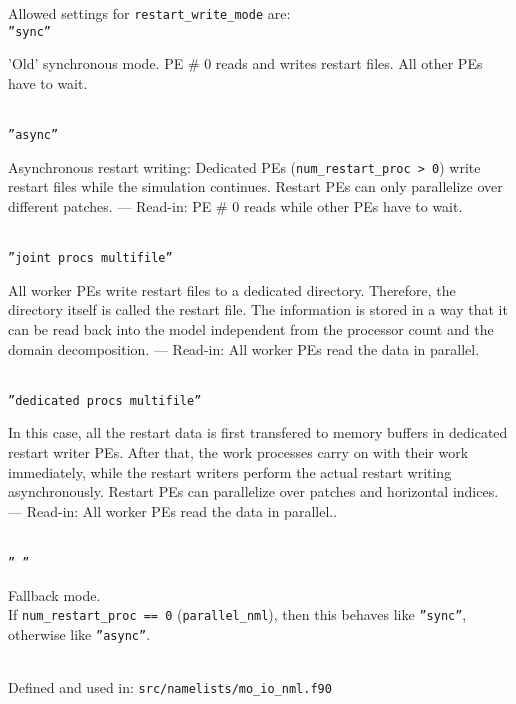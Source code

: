 Allowed settings for \texttt{restart\_write\_mode} are:\\[1em]
\texttt{''sync''} \\
\hspace*{2em} 
\parbox{0.8\textwidth}{\raggedright%
  'Old' synchronous mode. PE \# 0 reads and writes restart files. All other PEs have to wait.}\\[1em]
%
\texttt{''async''} \\
\hspace*{2em} 
\parbox{0.8\textwidth}{\raggedright%
  Asynchronous restart writing:
  Dedicated PEs (\texttt{num\_restart\_proc > 0}) write restart files
  while the simulation continues.  Restart PEs can only parallelize
  over different patches. --- Read-in: PE \# 0 reads while other PEs
  have to wait.  } \\[1em]
%
\texttt{''joint procs multifile''} \\
\hspace*{2em} 
\parbox{0.8\textwidth}{\raggedright%
  All worker PEs write restart files to a dedicated
  directory. Therefore, the directory itself is called the restart
  file.  The information is stored in a way that it can be read back
  into the model independent from the processor count and the domain
  decomposition. --- Read-in: All worker PEs read the data in parallel.
 }\\[1em]
%
\texttt{''dedicated procs multifile''} \\
\hspace*{2em} 
\parbox{0.8\textwidth}{\raggedright%

  In this case, all the restart data is first transfered to memory
  buffers in dedicated restart writer PEs.  After that, the work
  processes carry on with their work immediately, while the restart
  writers perform the actual restart writing asynchronously.  Restart
  PEs can parallelize over patches and horizontal indices.
  --- Read-in: All worker PEs read the data in parallel..
}\\[1em]
%
\texttt{'' ''} \\
\hspace*{2em} 
\parbox{0.8\textwidth}{\raggedright%
  Fallback mode. \\ If \texttt{num\_restart\_proc == 0} (\texttt{parallel\_nml}),
  then this behaves like \texttt{''sync''}, otherwise like \texttt{''async''}.
}\\[1em]

Defined and used in: \verb+src/namelists/mo_io_nml.f90+


